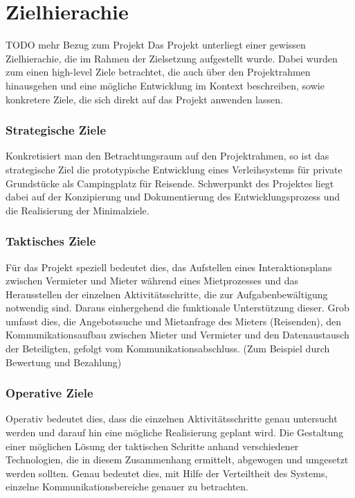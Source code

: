 
\section{Zielhierachie}

TODO mehr Bezug zum Projekt
Das Projekt unterliegt einer gewissen Zielhierachie, die im Rahmen der Zielsetzung aufgestellt wurde. Dabei wurden zum einen high-level Ziele betrachtet, die auch über den Projektrahmen hinausgehen und eine mögliche Entwicklung im Kontext beschreiben, sowie konkretere Ziele, die sich direkt auf das Projekt anwenden lassen.

\subsubsection{Strategische Ziele}
Konkretisiert man den Betrachtungsraum auf den Projektrahmen, so ist das strategische Ziel die prototypische Entwicklung eines Verleihsystems für private Grundstücke als Campingplatz für Reisende. Schwerpunkt des Projektes liegt dabei auf der Konzipierung und Dokumentierung des Entwicklungsprozess und die Realisierung der Minimalziele.

\subsubsection{Taktisches Ziele}
Für das Projekt speziell bedeutet dies, das Aufstellen eines Interaktionsplans zwischen Vermieter und Mieter während eines Mietprozesses und das Herausstellen der einzelnen Aktivitätsschritte, die zur Aufgabenbewältigung notwendig sind.
Daraus einhergehend die funktionale Unterstützung dieser. Grob umfasst dies, die Angebotssuche und Mietanfrage des Mieters (Reisenden), den Kommunikationsaufbau zwischen Mieter und Vermieter und den Datenaustausch der Beteiligten, gefolgt vom Kommunikationsabschluss. (Zum Beispiel durch Bewertung und Bezahlung)

\subsubsection{Operative Ziele}
Operativ bedeutet dies, dass die einzelnen Aktivitätsschritte genau untersucht werden und darauf hin eine mögliche Realisierung geplant wird. Die Gestaltung einer möglichen Lösung der taktischen Schritte anhand verschiedener Technologien, die in diesem Zusammenhang ermittelt, abgewogen und umgesetzt werden sollten.
Genau bedeutet dies, mit Hilfe der Verteiltheit des Systems, einzelne Kommunikationsbereiche genauer zu betrachten.

